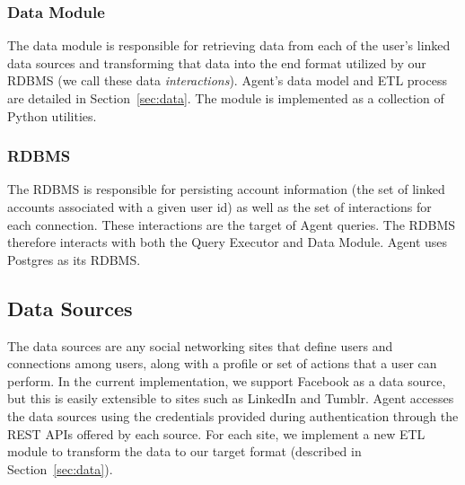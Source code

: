 \subsubsection{Data Module}
The data module is responsible for retrieving data from each of the user's
linked data sources and transforming that data into the end format utilized by
our RDBMS (we call these data {\it interactions}). Agent's data model and ETL
process are detailed in Section~\ref{sec:data}. The module is implemented as a
collection of Python utilities.

\subsubsection{RDBMS}
The RDBMS is responsible for persisting account information (the set of linked
accounts associated with a given user id) as well as the set of interactions for
each connection. These interactions are the target of Agent queries. The RDBMS
therefore interacts with both the Query Executor and Data Module. Agent uses
Postgres as its RDBMS.

\subsection{Data Sources}
The data sources are any social networking sites that define users and
connections among users, along with a profile or set of actions that a user can
perform. In the current implementation, we support Facebook as a data source,
but this is easily extensible to sites such as LinkedIn and Tumblr. Agent
accesses the data sources using the credentials provided during authentication
through the REST APIs offered by each source. For each site, we implement a new
ETL module to transform the data to our target format (described in
Section~\ref{sec:data}).
